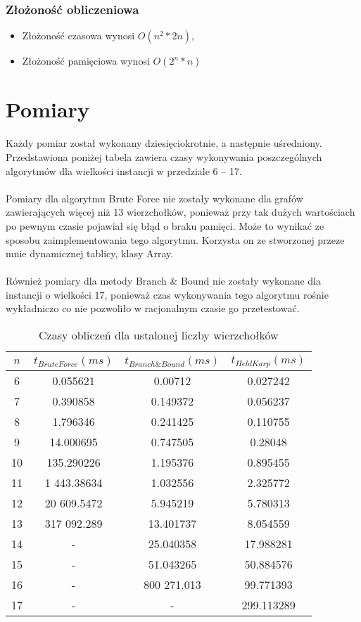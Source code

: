 \documentclass[12pt,a4paper,titlepage]{article}
\begin{document}
\subsubsection{Złożoność obliczeniowa}
\begin{itemize}
    \item Złożoność czasowa wynosi $O(n^2 \ast 2n)$,
    \item Złożoność pamięciowa wynosi $O(2^n \ast n)$
\end{itemize}
\section{Pomiary}
Każdy pomiar został wykonany dziesięciokrotnie, a następnie uśredniony. 
Przedstawiona poniżej tabela zawiera czasy wykonywania poszczególnych algorytmów dla wielkości instancji w przedziale 6 -- 17.
\\\\
Pomiary dla algorytmu Brute Force nie zostały wykonane dla grafów zawierających więcej niż 13 wierzchołków, ponieważ przy tak dużych wartościach po pewnym czasie pojawiał się błąd o braku pamięci. Może to wynikać ze sposobu zaimplementowania tego algorytmu. Korzysta on ze stworzonej przeze mnie dynamicznej tablicy, klasy Array.
\\\\
Również pomiary dla metody Branch \& Bound nie zostały wykonane dla instancji o wielkości 17, ponieważ czas wykonywania tego algorytmu rośnie wykładniczo co nie pozwoliło w racjonalnym czasie go przetestować.

\begin{table}[H]
    \centering
	\label{tab:result}
	{\begin{tabular}{cccc}
		\hline
		$n$ &$t_{BruteForce} (ms) $ & $t_{Branch\&Bound} (ms)$ & $t_{HeldKarp} (ms)$\\
		\hline
        6  & 0.055621      & 0.00712        & 0.027242      \\
        7  & 0.390858      & 0.149372       & 0.056237      \\
        8  & 1.796346      & 0.241425       & 0.110755      \\
        9  & 14.000695     & 0.747505       & 0.28048       \\
        10 & 135.290226    & 1.195376       & 0.895455      \\
        11 & 1 443.38634   & 1.032556       & 2.325772      \\
        12 & 20 609.5472   & 5.945219       & 5.780313      \\
        13 & 317 092.289   & 13.401737      & 8.054559      \\
        14 & -             & 25.040358      & 17.988281     \\
        15 & -             & 51.043265      & 50.884576     \\
        16 & -             & 800 271.013    & 99.771393     \\
        17 & -             & -              & 299.113289    \\
		\hline
	\end{tabular}}
	\caption{Czasy obliczeń dla ustalonej liczby wierzchołków}
\end{table}
\end{document}
